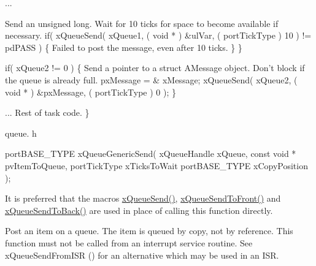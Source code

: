 \begin{DoxyPre}...
\begin{DoxyVerb}if( xQueue1 != 0 )
{
\end{DoxyVerb}

Send an unsigned long.  Wait for 10 ticks for space to become
available if necessary.
        if( xQueueSend( xQueue1, ( void * ) \&ulVar, ( portTickType ) 10 ) != pdPASS )
        \{
Failed to post the message, even after 10 ticks.
        \}
    \}\end{DoxyPre}



\begin{DoxyPre}    if( xQueue2 != 0 )
    \{
Send a pointer to a struct AMessage object.  Don't block if the
queue is already full.
        pxMessage = \& xMessage;
        xQueueSend( xQueue2, ( void * ) \&pxMessage, ( portTickType ) 0 );
    \}\end{DoxyPre}



\begin{DoxyPre}... Rest of task code.
 \}
 \end{DoxyPre}


queue. h 
\begin{DoxyPre}
 portBASE\_TYPE xQueueGenericSend(
                                    xQueueHandle xQueue,
                                    const void * pvItemToQueue,
                                    portTickType xTicksToWait
                                    portBASE\_TYPE xCopyPosition
                                );
   \end{DoxyPre}


It is preferred that the macros \hyperlink{queue_8h_af7eb49d3249351176992950d9185abe9}{x\-Queue\-Send()}, \hyperlink{queue_8h_aa612fcc2b1ceee0200f34b942e300b41}{x\-Queue\-Send\-To\-Front()} and \hyperlink{queue_8h_a81d24a2c1199d58efb76fbee15853112}{x\-Queue\-Send\-To\-Back()} are used in place of calling this function directly.

Post an item on a queue. The item is queued by copy, not by reference. This function must not be called from an interrupt service routine. See x\-Queue\-Send\-From\-I\-S\-R () for an alternative which may be used in an I\-S\-R.


